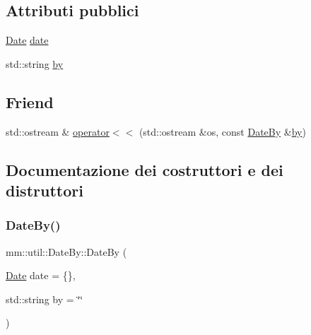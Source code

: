 \subsection*{Attributi pubblici}
\begin{DoxyCompactItemize}
\item 
\mbox{\hyperlink{structmm_1_1util_1_1_date}{Date}} \mbox{\hyperlink{structmm_1_1util_1_1_date_by_a4adb77c6560794be119e39b374498b68}{date}}
\item 
std\+::string \mbox{\hyperlink{structmm_1_1util_1_1_date_by_ae431f5029222a6ec9293c4c4564834f3}{by}}
\end{DoxyCompactItemize}
\subsection*{Friend}
\begin{DoxyCompactItemize}
\item 
std\+::ostream \& \mbox{\hyperlink{structmm_1_1util_1_1_date_by_aee4b77cd66c6fc86b3346dcb9fc9992a}{operator$<$$<$}} (std\+::ostream \&os, const \mbox{\hyperlink{structmm_1_1util_1_1_date_by}{Date\+By}} \&\mbox{\hyperlink{structmm_1_1util_1_1_date_by_ae431f5029222a6ec9293c4c4564834f3}{by}})
\end{DoxyCompactItemize}


\subsection{Documentazione dei costruttori e dei distruttori}
\mbox{\label{structmm_1_1util_1_1_date_by_a2e30c048476714b88489a1a90a1f976c}} 
\subsubsection{\texorpdfstring{Date\+By()}{DateBy()}}
{\footnotesize\ttfamily mm\+::util\+::\+Date\+By\+::\+Date\+By (\begin{DoxyParamCaption}\item[{\mbox{\hyperlink{structmm_1_1util_1_1_date}{Date}}}]{date = {\ttfamily \{\}},  }\item[{std\+::string}]{by = {\ttfamily \char`\"{}\char`\"{}} }\end{DoxyParamCaption})}



